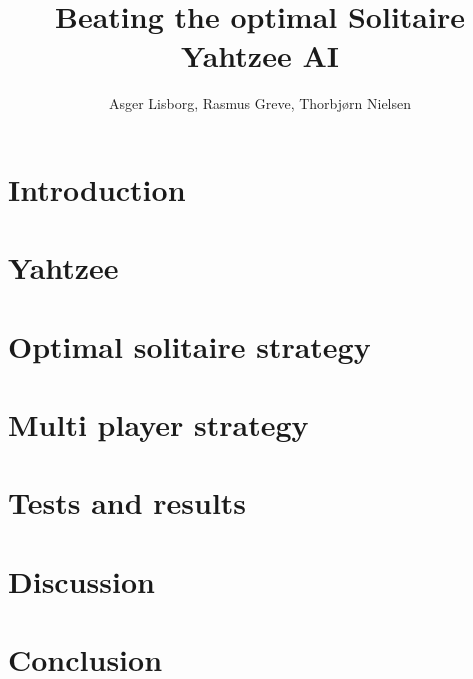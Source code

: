 \documentclass[twocolumn]{article}
\title{Beating the optimal Solitaire Yahtzee AI}
\author{Asger Lisborg, Rasmus Greve, Thorbjørn Nielsen}
\begin{document}
\maketitle

\begin{abstract}

\end{abstract}


\section{Introduction}


\section{Yahtzee}


\section{Optimal solitaire strategy}

\label{sec:optimalSingleAI}

\section{Multi player strategy}

\label{sec:subOptimalMPAI}



\section{Tests and results}

\label{sec:testsAndResults}


\section{Discussion}


\section{Conclusion}





\end{document}
